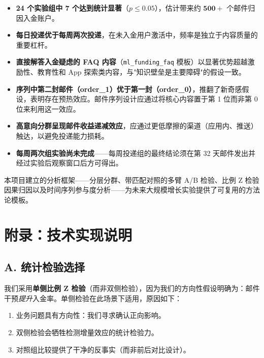 \documentclass[12pt,a4paper]{ctexart}
\begin{document}
\begin{itemize}[leftmargin=2em]
  \item \textbf{24 个实验组中 7 个达到统计显著}（$p \leq 0.05$），估计带来约 $\mathbf{500+}$ 个邮件归因入金账户。

  \item \textbf{每日投递优于每周两次投递}，在未入金用户激活中，频率是独立于内容质量的重要杠杆。

  \item \textbf{直接解答入金疑虑的 FAQ 内容}（\texttt{ml\_funding\_faq} 模板）以显著优势超越激励性、教育性和 App 探索类内容，与"知识壁垒是主要障碍"的假设一致。

  \item \textbf{序列中第二封邮件（order\_1）优于第一封（order\_0）}，推翻了新奇感假设，表明存在预热效应。邮件序列设计应通过将核心内容置于第 1 位而非第 0 位来利用这一效应。

  \item \textbf{高意向分群呈现邮件收益递减效应}，应通过更低摩擦的渠道（应用内、推送）触达，以避免投递能力损耗。

  \item \textbf{每周两次组实验尚未完成}——每周投递组的最终结论须在第 32 天邮件发出并经过实验后观察窗口后方可得出。

\end{itemize}

本项目建立的分析框架——分层分群、带匹配对照的多臂 A/B 检验、比例 Z 检验因果归因以及时间序列参与度分析——为未来大规模增长实验提供了可复用的方法论模板。

\clearpage
{}
\section*{附录：技术实现说明}

\subsection*{A. 统计检验选择}

我们采用\textbf{单侧比例 Z 检验}（而非双侧检验），因为我们的方向性假设明确为：邮件干预\textit{提升}入金率。单侧检验在此场景下适用，原因如下：

\begin{enumerate}[leftmargin=2em]
  \item 业务问题具有方向性：我们寻求确认正向影响。
  \item 双侧检验会牺牲检测增量效应的统计检验力。
  \item 对照组比较提供了干净的反事实（而非前后对比设计）。
\end{enumerate}
\end{document}
